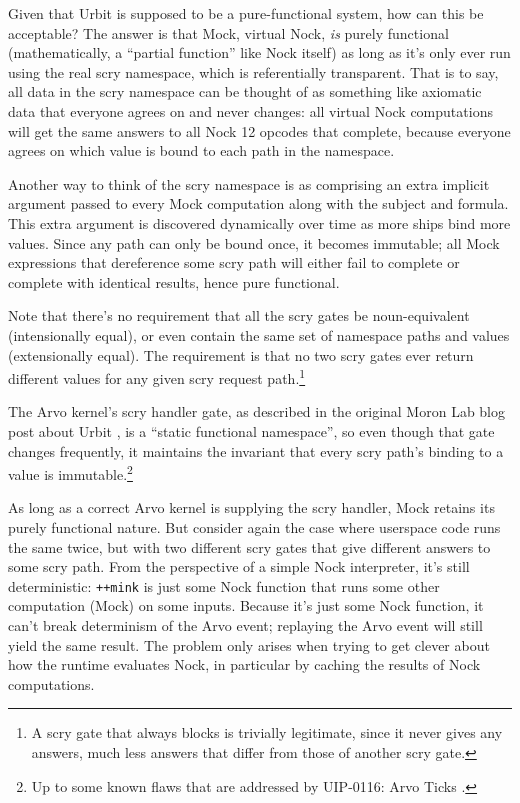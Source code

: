 \documentclass[twoside]{article}
\begin{document}
Given that Urbit is supposed to be a pure-functional system, how can this be acceptable?  The answer is that Mock, virtual Nock, \emph{is} purely functional (mathematically, a ``partial function'' like Nock itself) as long as it's only ever run using the real scry namespace, which is referentially transparent.  That is to say, all data in the scry namespace can be thought of as something like axiomatic data that everyone agrees on and never changes:  all virtual Nock computations will get the same answers to all Nock 12 opcodes that complete, because everyone agrees on which value is bound to each path in the namespace.

Another way to think of the scry namespace is as comprising an extra implicit argument passed to every Mock computation along with the subject and formula.  This extra argument is discovered dynamically over time as more ships bind more values.  Since any path can only be bound once, it becomes immutable; all Mock expressions that dereference some scry path will either fail to complete or complete with identical results, hence pure functional.

Note that there's no requirement that all the scry gates be noun-equivalent (intensionally equal), or even contain the same set of namespace paths and values (extensionally equal). The requirement is that no two scry gates ever return different values for any given scry request path.\footnote{A scry gate that always blocks is trivially legitimate, since it never gives any answers, much less answers that differ from those of another scry gate.}

The Arvo kernel's scry handler gate, as described in the original Moron Lab blog post about Urbit \citep{Yarvin2010}, is a ``static functional namespace'', so even though that gate changes frequently, it maintains the invariant that every scry path's binding to a value is immutable.\footnote{Up to some known flaws that are addressed by UIP-0116: Arvo Ticks \citep{Monk2023, Monk2023a, Wilson2024}.}

As long as a correct Arvo kernel is supplying the scry handler, Mock retains its purely functional nature.  But consider again the case where userspace code runs the same \texttt{} twice, but with two different scry gates that give different answers to some scry path. From the perspective of a simple Nock interpreter, it's still deterministic:  \texttt{++mink} is just some Nock function that runs some other computation (Mock) on some inputs.  Because it's just some Nock function, it can't break determinism of the Arvo event; replaying the Arvo event will still yield the same result.  The problem only arises when trying to get clever about how the runtime evaluates Nock, in particular by caching the results of Nock computations.
\end{document}
